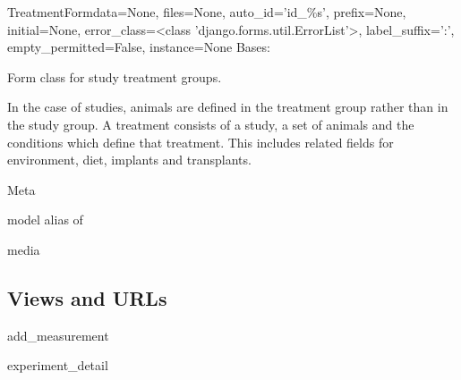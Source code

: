 \documentclass[letterpaper,10pt,english]{sphinxmanual}
\begin{document}
\hypertarget{data.forms.TreatmentForm}{}\begin{classdesc}{TreatmentForm}{data=None, files=None, auto\_id='id\_\%s', prefix=None, initial=None, error\_class=\textless{}class 'django.forms.util.ErrorList'\textgreater{}, label\_suffix=':', empty\_permitted=False, instance=None}
Bases: 

Form class for study treatment groups.

In the case of studies, animals are defined in the treatment group rather than in the study group.  A treatment consists of a study, a set of animals and the conditions which define that treatment.  This includes related fields for environment, diet, implants and transplants.

\hypertarget{data.forms.TreatmentForm.Meta}{}\begin{classdesc}{Meta}{}~

\hypertarget{data.forms.TreatmentForm.Meta.model}{}\begin{memberdesc}{model}
alias of 
\end{memberdesc}
\end{classdesc}

\hypertarget{data.forms.TreatmentForm.media}{}\begin{memberdesc}[TreatmentForm]{media}\end{memberdesc}
\end{classdesc}


\subsection{Views and URLs}
\hypertarget{module-data.views}{}
\modulesynopsis{}

\hypertarget{data.views.add\_measurement}{}\begin{memberdesc}{add\_measurement}\end{memberdesc}

\hypertarget{data.views.experiment\_detail}{}\begin{memberdesc}{experiment\_detail}\end{memberdesc}
\end{document}
